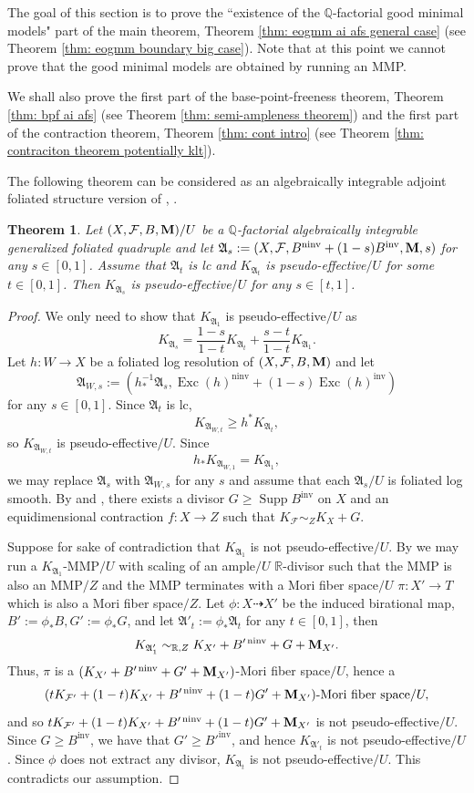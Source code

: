 \documentclass[12pt]{amsart}
\numberwithin{equation}{section}
\newcommand{\Mm}{{\bf{M}}}
\newcommand{\Rr}{\mathbb{R}}
\newcommand{\Exc}{\operatorname{Exc}}
\newcommand{\ninv}{\operatorname{ninv}}
\newcommand{\inv}{\operatorname{inv}}
\newcommand{\Supp}{\operatorname{Supp}}
\newcommand{\Aa}{{\mathfrak{A}}}
\newcommand{\Ff}{\mathcal{F}}
\newtheorem{thm}{Theorem}[section]
\theoremstyle{definition}
\theoremstyle{definition}
\theoremstyle{definition}
\begin{document}
The goal of this section is to prove the ``existence of the $\mathbb Q$-factorial good minimal models" part of the main theorem, Theorem \ref{thm: eogmm ai afs general case} (see Theorem \ref{thm: eogmm boundary big case}). Note that at this point we cannot prove that the good minimal models are obtained by running an MMP.

We shall also prove the first part of the base-point-freeness theorem, Theorem \ref{thm: bpf ai afs} (see Theorem \ref{thm: semi-ampleness theorem}) and the first part of the contraction theorem, Theorem \ref{thm: cont intro} (see Theorem \ref{thm: contraciton theorem potentially klt}).

The following theorem can be considered as an algebraically integrable adjoint foliated structure version of \cite[Theorems 1.2, 1.3]{CP19}, \cite[Theorem 1.2]{ACSS21}. 

\begin{thm}\label{thm: non-pseudo-effective for afs}
    Let $(X,\Ff,B,\Mm)/U$ be a $\mathbb Q$-factorial algebraically integrable generalized foliated quadruple and let $\Aa_s:=(X,\Ff,B^{\ninv}+(1-s)B^{\inv},\Mm,s)$ for any $s\in [0,1]$. Assume that $\Aa_{t}$ is lc and $K_{\Aa_{t}}$ is pseudo-effective$/U$ for some $t\in [0,1]$. Then $K_{\Aa_s}$ is pseudo-effective$/U$ for any $s\in [t,1]$.
\end{thm}
\begin{proof}
We only need to show that $K_{\Aa_1}$ is pseudo-effective$/U$ as $$K_{\Aa_s}=\frac{1-s}{1-t}K_{\Aa_t}+\frac{s-t}{1-t}K_{\Aa_1}.$$
Let $h: W\rightarrow X$ be a foliated log resolution of $(X,\Ff,B,\Mm)$ and let $$\Aa_{W,s}:=(h^{-1}_*\Aa_s,\Exc(h)^{\ninv}+(1-s)\Exc(h)^{\inv})$$
for any $s\in [0,1]$. Since $\Aa_t$ is lc,
$$K_{\Aa_{W,t}}\geq h^*K_{\Aa_t},$$
so $K_{\Aa_{W,t}}$ is pseudo-effective$/U$. Since $$h_*K_{\Aa_{W,1}}=K_{\Aa_1},$$
we may replace $\Aa_s$ with $\Aa_{W,s}$ for any $s$ and assume that each $\Aa_s/U$ is foliated log smooth. By \cite[Proposition 3.6]{ACSS21} and \cite[Proposition 7.3.6]{CHLX23}, there exists a divisor $G\geq\Supp B^{\inv}$ on $X$ and an equidimensional contraction $f: X\rightarrow Z$ such that $K_{\Ff}\sim_ZK_X+G$. 

Suppose for sake of contradiction  that $K_{\Aa_1}$ is not pseudo-effective$/U$. By \cite[Proposition 9.3.3]{CHLX23} we may run a $K_{\Aa_1}$-MMP$/U$ with scaling of an ample$/U$ $\Rr$-divisor such that the MMP is also an MMP$/Z$ and the MMP terminates with a Mori fiber space$/U$ $\pi: X'\rightarrow T$ which is also a Mori fiber space$/Z$. Let $\phi: X\dashrightarrow X'$ be the induced birational map, $B':=\phi_*B,G':=\phi_*G$, and let $\Aa'_t:=\phi_*\Aa_t$ for any $t\in [0,1]$, then 
$$K_{\Aa_1'}\sim_{\mathbb R,Z}K_{X'}+B'^{\ninv}+G+\Mm_{X'}.$$
Thus, $\pi$ is a $(K_{X'}+B'^{\ninv}+G'+\Mm_{X'})$-Mori fiber space$/U$, hence a 
$$(tK_{\Ff'}+(1-t)K_{X'}+B'^{\ninv}+(1-t)G'+\Mm_{X'})\text{-Mori fiber space}/U,$$
and so $tK_{\Ff'}+(1-t)K_{X'}+B'^{\ninv}+(1-t)G'+\Mm_{X'}$ is not pseudo-effective$/U$. Since $G\geq B^{\inv}$, we have that $G'\geq B'^{\inv}$, and hence $K_{\Aa'_t}$ is not pseudo-effective$/U$. Since $\phi$ does not extract any divisor, $K_{\Aa_t}$ is not pseudo-effective$/U$. This contradicts our assumption.
\end{proof}
\end{document}
